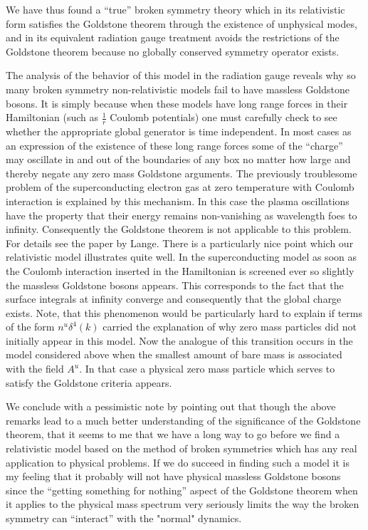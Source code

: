 \documentclass[%
  12pt,
  paper=letter,
  abstracton,
  pagesize=auto,
  version=last,
  DIV=calc
  ]{article}
\begin{document}
We have thus found a ``true'' broken symmetry theory which in its
relativistic form satisfies the Goldstone theorem through the
existence of unphysical modes, and in its equivalent radiation gauge
treatment avoids the restrictions of the Goldstone theorem because no
globally conserved symmetry operator exists.

The analysis of the behavior of this model in the radiation gauge
reveals why so many broken symmetry non-relativistic models fail to
have massless Goldstone bosons.  It is simply because when these
models have long range forces in their Hamiltonian (such as
$\frac{1}{r}$ Coulomb potentials) one must carefully check to see
whether the appropriate global generator is time independent.  In most
cases as an expression of the existence of these long range forces
some of the ``charge'' may oscillate in and out of the boundaries of any
box no matter how large and thereby negate any zero mass Goldstone
arguments.  The previously troublesome problem of the superconducting
electron gas at zero temperature with Coulomb interaction is explained
by this mechanism. \cite{7, 13}  In this case the plasma oscillations
have the property that their energy remains non-vanishing as
wavelength foes to infinity.  Consequently the Goldstone theorem is
not applicable to this problem.  For details see the paper by Lange.
There is a particularly nice point which our relativistic model
illustrates quite well.  In the superconducting model as soon as the
Coulomb interaction inserted in the Hamiltonian is screened ever so
slightly the massless Goldstone bosons appears.  This corresponds to
the fact that the surface integrals at infinity converge and
consequently that the global charge exists.  Note, that this
phenomenon would be particularly hard to explain if terms of the form
$n^u \delta^4 (k)$ carried the explanation of why zero mass particles
did not initially appear in this model.  Now the analogue of this
transition occurs in the model considered above when the smallest
amount of bare mass is associated with the field $A^u$.  In that case
a physical zero mass particle which serves to satisfy the Goldstone
criteria appears.

We conclude with a pessimistic note by pointing out that though the
above remarks lead to a much better understanding of the significance
of the Goldstone theorem, that it seems to me that we have a long way
to go before we find a relativistic model based on the method of
broken symmetries which has any real application to physical problems.
If we do succeed in finding such a model it is my feeling that it
probably will not have physical massless Goldstone bosons since the
``getting something for nothing'' aspect of the Goldstone theorem when
it applies to the physical mass spectrum very seriously limits the way
the broken symmetry can ``interact'' with the "normal" dynamics.
\end{document}
